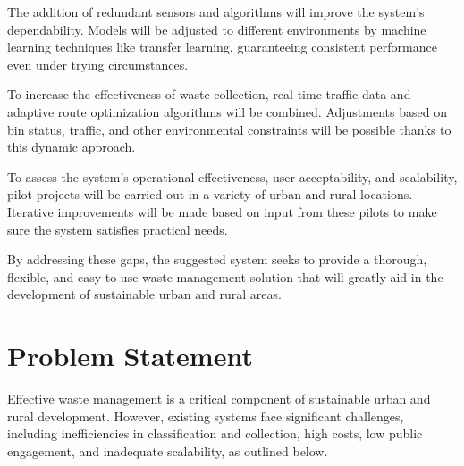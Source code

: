 The addition of redundant sensors and algorithms will improve the system's dependability. Models will be adjusted to different environments by machine learning techniques like transfer learning, guaranteeing consistent performance even under trying circumstances.

To increase the effectiveness of waste collection, real-time traffic data and adaptive route optimization algorithms will be combined. Adjustments based on bin status, traffic, and other environmental constraints will be possible thanks to this dynamic approach.

To assess the system's operational effectiveness, user acceptability, and scalability, pilot projects will be carried out in a variety of urban and rural locations. Iterative improvements will be made based on input from these pilots to make sure the system satisfies practical needs.

By addressing these gaps, the suggested system seeks to provide a thorough, flexible, and easy-to-use waste management solution that will greatly aid in the development of sustainable urban and rural areas.

\section{Problem Statement}

Effective waste management is a critical component of sustainable urban and rural development. However, existing systems face significant challenges, including inefficiencies in classification and collection, high costs, low public engagement, and inadequate scalability, as outlined below.


